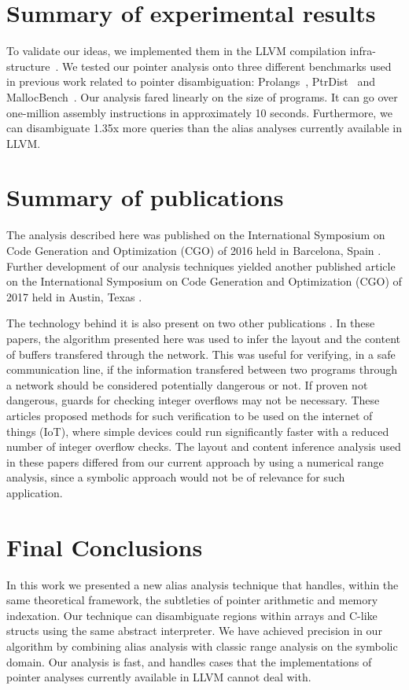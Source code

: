 \documentclass[12pt]{article}
\begin{document}
\section {Summary of experimental results}
To validate our ideas, we implemented them in the LLVM compilation
infra-structure~\cite{Lattner04}.
We tested our pointer analysis onto three different benchmarks
used in previous work related to pointer disambiguation:
Prolangs~\cite{Ryder01}, PtrDist~\cite{Zhao05} and MallocBench~\cite{Grunwald93}.
Our analysis fared linearly on the size of programs.
It can go over one-million assembly instructions in approximately 10 seconds.
Furthermore, we can disambiguate 1.35x more queries than the alias analyses
currently available in LLVM.

\section {Summary of publications}
The analysis described here was published on the International Symposium on 
Code Generation and Optimization (CGO) of 2016 held in Barcelona, Spain 
\cite{Paisante16}.  Further development of our analysis techniques yielded 
another published article on the International Symposium on 
Code Generation and Optimization (CGO) of 2017 held in Austin, Texas 
\cite{Maleej17}.

The technology behind it is also present on two other publications 
\cite{Paisante14, Saggioro15}. In these papers, the algorithm presented here was used
to infer the layout and the content of buffers transfered through the network. 
This was useful for verifying, in a safe communication line, if the information 
transfered between two programs through a network should be considered potentially 
dangerous or not. If proven not dangerous, guards for checking integer overflows
may not be necessary. These articles proposed methods for such verification to 
be used on the internet of things (IoT), where simple devices could run 
significantly faster with a reduced number of integer overflow checks. 
The layout and content inference analysis used in these papers differed from our 
current approach by using a numerical range analysis, since a symbolic approach 
would not be of relevance for such application.

\section {Final Conclusions}
In this work we presented a new alias analysis technique that handles,
within the same theoretical framework, the subtleties of pointer arithmetic
and memory indexation.
Our technique can disambiguate regions within arrays and C-like structs using
the same abstract interpreter.
We have achieved precision in our algorithm by combining
alias analysis with classic range analysis on the symbolic domain.
Our analysis is fast, and handles cases that the implementations of
pointer analyses currently available in LLVM cannot deal with.
\end{document}

